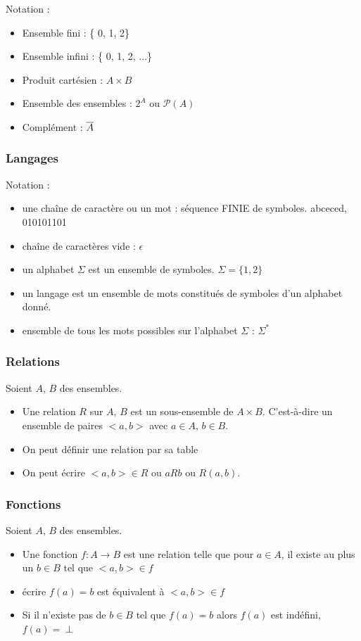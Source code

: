 Notation : 
\begin{itemize}
	\item Ensemble fini : \{ 0, 1, 2\}
	\item Ensemble infini : \{ 0, 1, 2, ...\}
	\item Produit cartésien : $A \times B$
	\item Ensemble des ensembles : $2^A$ ou $\mathcal{P}(A)$
	\item Complément : $\overline{A}$
\end{itemize}


\subsubsection{Langages}
\label{ssub:Langages}
Notation : 
\begin{itemize}
	\item une chaîne de caractère ou un mot : séquence FINIE de symboles. 
		abceced, 010101101
	\item chaîne de caractères vide : $\epsilon$
	\item un alphabet $\Sigma$ est un ensemble de symboles. $\Sigma = \{1, 2\}$
	\item un langage est un ensemble de mots constitués de symboles d'un alphabet
		donné.
	\item ensemble de tous les mots possibles sur l'alphabet $\Sigma$ : $\Sigma ^*$
\end{itemize}


\subsubsection{Relations}
\label{ssub:relations}
Soient $A$, $B$ des ensembles.
\begin{itemize}
	\item Une relation $R$ sur $A$, $B$ est un sous-ensemble de $A \times B$. C'est-à-dire
		un ensemble de paires $<a,b>$ avec $a\in A$, $b\in B$.
	\item On peut définir une relation par sa table
	\item On peut écrire $<a,b> \in R$ ou $aRb$ ou $R(a,b)$. 
\end{itemize}


\subsubsection{Fonctions}
\label{ssub:fonctions}
Soient $A$, $B$ des ensembles.
\begin{itemize}
	\item Une fonction $f: A \rightarrow B$ est une relation telle que pour $a \in
	A$, il existe au plus un $b \in B$ tel que $<a,b> \in f$
	\item écrire $f(a)=b$ est équivalent à $<a,b> \in f$
	\item Si il n'existe pas de $b \in B$ tel que $f(a)=b$ alors $f(a)$ est indéfini,
		$f(a) = \perp$
\end{itemize}

